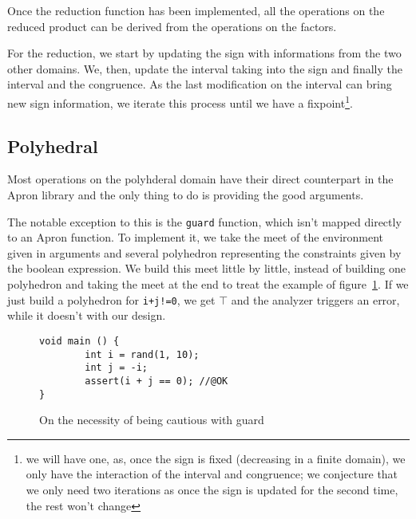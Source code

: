 \documentclass[11pt]{article}
\begin{document}
Once the reduction function has been implemented, all the operations on the
reduced product can be derived from the operations on the factors.

For the reduction, we start by updating the sign with informations from the two
other domains. We, then, update the interval taking into the sign and finally
the interval and the congruence. As the last modification on the interval can
bring new sign information, we iterate this process until we have a
fixpoint\footnote{we will have one, as, once the sign is fixed (decreasing in a
finite domain), we only have the interaction of the interval and congruence; we
conjecture that we only need two iterations as once the sign is updated for the
second time, the rest won't change}.
\subsection{Polyhedral}
Most operations on the polyhderal domain have their direct counterpart in the
\textsf{Apron} library and the only thing to do is providing the good arguments.

The notable exception to this is the \texttt{guard} function, which isn't mapped
directly to an \textsf{Apron} function. To implement it, we take the meet of the
environment given in arguments and several polyhedron representing the
constraints given by the boolean expression. We build this meet little by
little, instead of building one polyhedron and taking the meet at the end to
treat the example of figure~\ref{poly}. If we just build a polyhedron for
\texttt{i+j!=0}, we get $\top$ and the analyzer triggers an error, while
it doesn't with our design.
\begin{figure}[h]
\begin{verbatim}
void main () {
        int i = rand(1, 10);
        int j = -i;
        assert(i + j == 0); //@OK
}
\end{verbatim}
\caption{On the necessity of being cautious with guard}\label{poly}
\end{figure}
\end{document}
